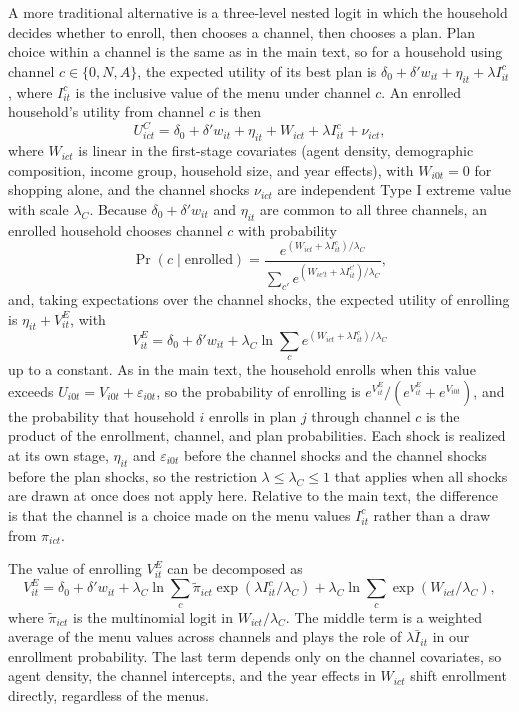 \documentclass[12pt]{article}
\begin{document}
A more traditional alternative is a three-level nested logit in which the household decides whether to enroll, then chooses a channel, then chooses a plan. Plan choice within a channel is the same as in the main text, so for a household using channel $c \in \{0, N, A\}$, the expected utility of its best plan is $\delta_0 + \delta' w_{it} + \eta_{it} + \lambda I^c_{it}$, where $I^c_{it}$ is the inclusive value of the menu under channel $c$. An enrolled household's utility from channel $c$ is then
$$U^C_{ict} = \delta_0 + \delta' w_{it} + \eta_{it} + W_{ict} + \lambda I^c_{it} + \nu_{ict},$$
where $W_{ict}$ is linear in the first-stage covariates (agent density, demographic composition, income group, household size, and year effects), with $W_{i0t} = 0$ for shopping alone, and the channel shocks $\nu_{ict}$ are independent Type I extreme value with scale $\lambda_C$. Because $\delta_0 + \delta' w_{it}$ and $\eta_{it}$ are common to all three channels, an enrolled household chooses channel $c$ with probability
$$\Pr(c \mid \text{enrolled}) = \frac{e^{(W_{ict} + \lambda I^c_{it})/\lambda_C}}{\sum_{c'} e^{(W_{ic't} + \lambda I^{c'}_{it})/\lambda_C}},$$
and, taking expectations over the channel shocks, the expected utility of enrolling is $\eta_{it} + V^E_{it}$, with
$$V^E_{it} = \delta_0 + \delta' w_{it} + \lambda_C \ln \sum_{c} e^{(W_{ict} + \lambda I^c_{it})/\lambda_C}$$
up to a constant. As in the main text, the household enrolls when this value exceeds $U_{i0t} = V_{i0t} + \varepsilon_{i0t}$, so the probability of enrolling is $e^{V^E_{it}}/(e^{V^E_{it}} + e^{V_{i0t}})$, and the probability that household $i$ enrolls in plan $j$ through channel $c$ is the product of the enrollment, channel, and plan probabilities. Each shock is realized at its own stage, $\eta_{it}$ and $\varepsilon_{i0t}$ before the channel shocks and the channel shocks before the plan shocks, so the restriction $\lambda \leq \lambda_C \leq 1$ that applies when all shocks are drawn at once does not apply here. Relative to the main text, the difference is that the channel is a choice made on the menu values $I^c_{it}$ rather than a draw from $\pi_{ict}$.

The value of enrolling $V^E_{it}$ can be decomposed as
$$V^E_{it} = \delta_0 + \delta' w_{it} + \lambda_C \ln \sum_c \tilde{\pi}_{ict} \exp\left(\lambda I^c_{it}/\lambda_C\right) + \lambda_C \ln \sum_c \exp\left(W_{ict}/\lambda_C\right),$$
where $\tilde{\pi}_{ict}$ is the multinomial logit in $W_{ict}/\lambda_C$. The middle term is a weighted average of the menu values across channels and plays the role of $\lambda \bar{I}_{it}$ in our enrollment probability. The last term depends only on the channel covariates, so agent density, the channel intercepts, and the year effects in $W_{ict}$ shift enrollment directly, regardless of the menus.
\end{document}
